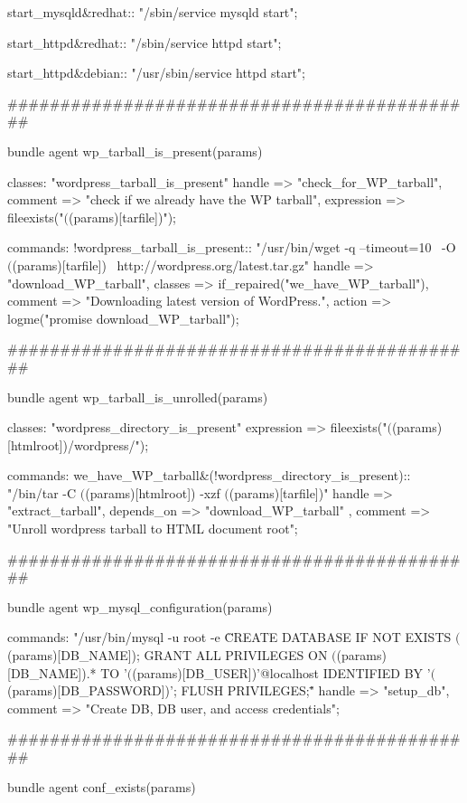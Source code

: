 \begin{codelisting}
\begin{code}
{    start_mysqld&redhat::
      "/sbin/service mysqld start";

    start_httpd&redhat::
      "/sbin/service httpd start";

    start_httpd&debian::
      "/usr/sbin/service httpd start";
}

#############################################

bundle agent wp_tarball_is_present(params)
{

  classes:
      "wordpress_tarball_is_present"
        handle => "check_for_WP_tarball",
        comment => "check if we already have the WP tarball",
        expression => fileexists("$($(params)[tarfile])");

  commands:
    !wordpress_tarball_is_present::
      "/usr/bin/wget -q --timeout=10 \
                     -O $($(params)[tarfile]) \
                     http://wordpress.org/latest.tar.gz"
        handle => "download_WP_tarball",
        classes => if_repaired("we_have_WP_tarball"),
        comment => "Downloading latest version of WordPress.",
        action => logme("promise download_WP_tarball");
}

#############################################

bundle agent wp_tarball_is_unrolled(params)
{

  classes:
      "wordpress_directory_is_present"
        expression => fileexists("$($(params)[htmlroot])/wordpress/");

  commands:
    we_have_WP_tarball&(!wordpress_directory_is_present)::
      "/bin/tar -C $($(params)[htmlroot]) -xzf $($(params)[tarfile])"
        handle => "extract_tarball",
        depends_on => { "download_WP_tarball" },
        comment => "Unroll wordpress tarball to HTML document root";
}

#############################################

bundle agent wp_mysql_configuration(params)
{

  commands:
      "/usr/bin/mysql -u root -e \"
      CREATE DATABASE IF NOT EXISTS $($(params)[DB_NAME]);
      GRANT ALL PRIVILEGES ON $($(params)[DB_NAME]).*
      TO '$($(params)[DB_USER])'@localhost
      IDENTIFIED BY '$($(params)[DB_PASSWORD])';
      FLUSH PRIVILEGES;\"
"
        handle => "setup_db",
        comment => "Create DB, DB user, and access credentials";

}

#############################################

bundle agent conf_exists(params)
{

}
\end{code}
\end{codelisting}
